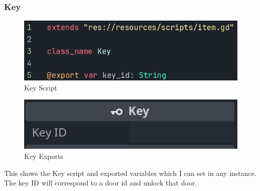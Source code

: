 \documentclass{article}
\begin{document}
        \subsubsection{Key}
        \begin{multicols}{2}
                \begin{figure}[H]
                        \centering
                        \includegraphics[width = \columnwidth]{images/development/Key_script.PNG}
                        \caption{Key Script}
                \end{figure}
                \begin{figure}[H]
                        \centering
                        \includegraphics[width = 0.9\columnwidth]{images/development/Key_export.PNG}
                        \caption{Key Exports}
                \end{figure}
        \end{multicols}
        \[\]
        This shows the Key script and exported variables which I can set in any instance. The key ID will correspond to a door id and unlock that door.\\

\newpage
\end{document}
